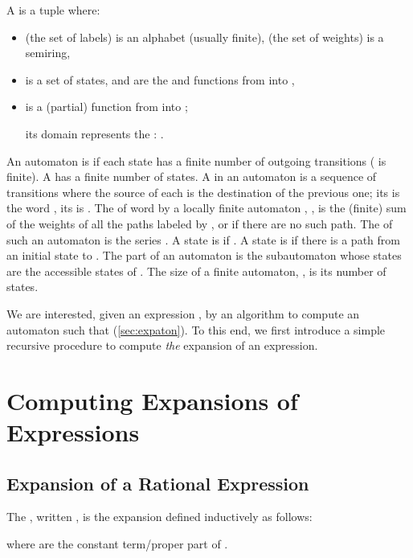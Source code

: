 \documentclass[a4paper,USenglish]{lipics}
\begin{document}
\begin{Definition}[Automaton]
  A   is a tuple 
  where:
  \begin{itemize}
  \item  (the set of labels) is an alphabet (usually finite),
      (the set of weights) is a
    semiring,
  \item  is a set of states,  and 
    are the  and  functions from  into ,
  \item  is a (partial) function from  into
    ;

    its domain represents the :
    .
  \end{itemize}
\end{Definition}
An automaton is  if each state has a finite number of
outgoing transitions ( is
finite).  A  has a finite number of states.
A   in an automaton is a sequence of transitions
 where the source
of each is the destination of the previous one; its  is the word
, its  is
.
The  of word  by a locally finite automaton ,
, is the (finite) sum of the weights of all the paths labeled by
, or  if there are no such path.  The  of such an
automaton  is the series .  A
state  is  if .  A state  is
 if there is a path from an initial state to .  The  part
of an automaton  is the subautomaton whose states are the accessible
states of .  The size of a finite automaton, , is its
number of states.



We are interested, given an expression , by an algorithm to compute an
automaton  such that 
(\cref{sec:expaton}).  To this end, we first introduce a simple recursive
procedure to compute \emph{the} expansion of an expression.

\section{Computing Expansions of Expressions}
\label{sec:expr-to-expa}


\subsection{Expansion of a Rational Expression}
\label{sec:expa-of-expr}
\begin{Definition}
  \label{def:expa-of-expr}
  The  , written , is
  the expansion defined inductively as follows:
  
  where  are
  the constant term/proper part of .
\end{Definition}
\end{document}

